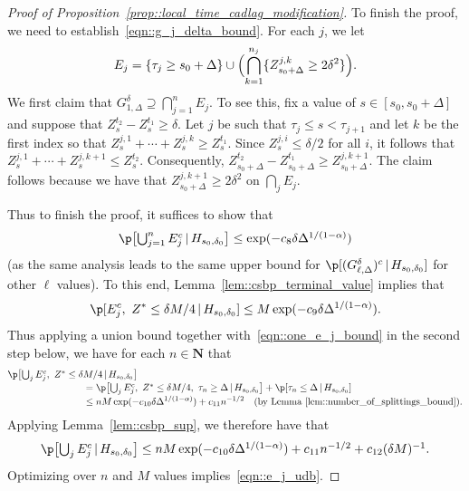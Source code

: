 \documentclass[JEP,XML,SOM,Unicode]{cedram}
\theoremstyle{plain}
\numberwithin{theorem}{section}
\theoremstyle{definition}
\newcommand{\N}{\mathbf{N}}
\newcommand{\giv}{\,|\,}
\begin{document}
\begin{proof}[Proof of Proposition~\ref{prop::local_time_cadlag_modification}]
To finish the proof, we need to establish~\eqref{eqn::g_j_delta_bound}. For each $j$, we let\vspace*{-3pt}
\[
E_j = \{\tau_j \geq s_0 + \Delta \} \cup \Bigl( \bigcap_{k=1}^{n_j} \{ Z_{s_0+\Delta}^{j,k} \geq 2\delta^2\} \Bigr).
\]
We first claim that $G_{1,\Delta}^\delta \supseteq \bigcap_{j=1}^n E_j$. To see this, fix a value of $s \in [s_0,s_0 + \Delta]$ and suppose that $Z_s^{t_2} - Z_s^{t_1} \geq \delta$. Let $j$ be such that $\tau_j \leq s < \tau_{j+1}$ and let $k$ be the first index so that $Z_s^{j,1} + \cdots + Z_s^{j,k} \geq Z_s^{t_1}$. Since $Z_s^{j,i} \leq \delta/2$ for all $i$, it follows that $Z_s^{j,1} + \cdots + Z_s^{j,k+1} \leq Z_s^{t_2}$. Consequently, $Z_{s_0+\Delta}^{t_2} - Z_{s_0+\Delta}^{t_1} \geq Z_{s_0+\Delta}^{j,k+1}$. The claim follows because we have that $Z_{s_0+\Delta}^{j,k+1} \geq 2\delta^2$ on $\bigcap_j E_j$.

Thus to finish the proof, it suffices to show that\vspace*{-3pt}
\begin{equation}
\label{eqn::e_j_udb}
\p\bigl[ \textstyle\bigcup_{j=1}^n E_j^c \giv H_{s_0,\delta_0}\bigr] \leq \exp(-c_8 \delta \Delta^{1/(1-\alpha)})
\end{equation}
(as the same analysis leads to the same upper bound for $\p[(G_{\ell,\Delta}^\delta)^c \giv H_{s_0,\delta_0}]$ for other $\ell$ values). To this end,
Lemma~\ref{lem::csbp_terminal_value} implies that
\begin{equation}
\label{eqn::one_e_j_bound}
\p[ E_j^c,\ Z^* \leq \delta M/4 \giv H_{s_0,\delta_0}] \leq M \exp(-c_9 \delta \Delta^{1/(1-\alpha)}).
\end{equation}
Thus applying a union bound together with~\eqref{eqn::one_e_j_bound} in the second step below, we have for each $n \in \N$ that
\begin{align}
\p\bigl[\textstyle\bigcup_j E_j^c,\ Z^* \leq \delta &M/4 \giv H_{s_0,\delta_0}\bigr] \notag\\[-3pt]
&= \p\bigl[\textstyle\bigcup_j E_j^c,\ Z^* \leq \delta M/4,\ \tau_n \geq \Delta \giv H_{s_0,\delta_0}\bigr] + \p[ \tau_n \leq \Delta \giv H_{s_0,\delta_0}] \notag\\[-3pt]
&\leq n M \exp(- c_{10} \delta \Delta^{1/(1-\alpha)}) + c_{11} n^{-1/2} \quad\text{(by Lemma~\ref{lem::number_of_splittings_bound})}.\label{eqn::e_j_one_step_bound}
\end{align}
Applying Lemma~\ref{lem::csbp_sup}, we therefore have that
\begin{equation}
\label{eqn::e_j_c_bound}
\p\bigl[\textstyle\bigcup_j E_j^c \giv H_{s_0,\delta_0}\bigr] \leq n M \exp(- c_{10} \delta \Delta^{1/(1-\alpha)}) + c_{11} n^{-1/2} + c_{12} (\delta M)^{-1}.
\end{equation}
Optimizing over $n$ and $M$ values implies~\eqref{eqn::e_j_udb}.
\end{proof}
\end{document}
